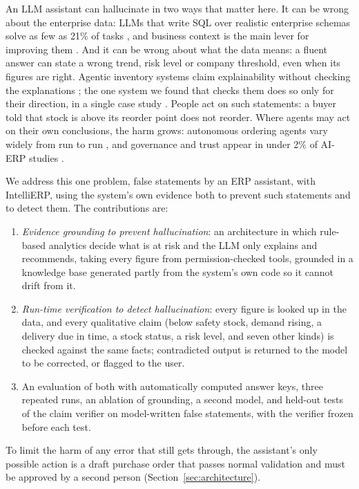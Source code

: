 \documentclass[conference]{IEEEtran}
\begin{document}
An LLM assistant can hallucinate in two ways that matter here. It can be wrong about the enterprise data:
LLMs that write SQL over realistic enterprise schemas solve as few as 21\% of tasks \cite{lei2025spider2},
and business context is the main lever for improving them \cite{sequeda2023kg,li2023bird}. And it can be
wrong about what the data means: a fluent answer can state a wrong trend, risk level or company threshold,
even when its figures are right. Agentic inventory systems claim explainability without checking the
explanations \cite{quan2024invagent}; the one system we found that checks them does so only for their
direction, in a single case study \cite{xue2026xai}. People act on such statements: a buyer told that stock
is above its reorder point does not reorder. Where agents may act on their own conclusions, the harm grows:
autonomous ordering agents vary widely from run to run \cite{long2026reliability}, and governance and trust
appear in under 2\% of AI-ERP studies \cite{hurbean2026erp}.

We address this one problem, false statements by an ERP assistant, with IntelliERP, using the system's own
evidence both to prevent such statements and to detect them. The contributions are:
\begin{enumerate}
\item \textit{Evidence grounding to prevent hallucination}: an architecture in which rule-based analytics
decide what is at risk and the LLM only explains and recommends, taking every figure from permission-checked
tools, grounded in a knowledge base generated partly from the system's own code so it cannot drift from it.
\item \textit{Run-time verification to detect hallucination}: every figure is looked up in the data, and
every qualitative claim (below safety stock, demand rising, a delivery due in time, a stock status, a risk
level, and seven other kinds) is checked against the same facts; contradicted output is returned to the
model to be corrected, or flagged to the user.
\item An evaluation of both with automatically computed answer keys, three repeated runs, an ablation of
grounding, a second model, and held-out tests of the claim verifier on model-written false statements, with
the verifier frozen before each test.
\end{enumerate}
To limit the harm of any error that still gets through, the assistant's only possible action is a draft
purchase order that passes normal validation and must be approved by a second person
(Section~\ref{sec:architecture}).
\end{document}
